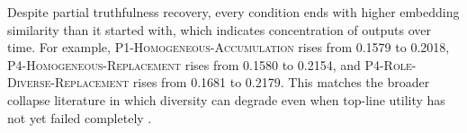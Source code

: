 Despite partial truthfulness recovery, every condition ends with higher embedding similarity than it started with, which indicates concentration of outputs over time. For example, \textsc{P1-Homogeneous-Accumulation} rises from 0.1579 to 0.2018, \textsc{P4-Homogeneous-Replacement} rises from 0.1580 to 0.2154, and \textsc{P4-Role-Diverse-Replacement} rises from 0.1681 to 0.2179. This matches the broader collapse literature in which diversity can degrade even when top-line utility has not yet failed completely \cite{shumailov2023curse,briesch2023large}.
